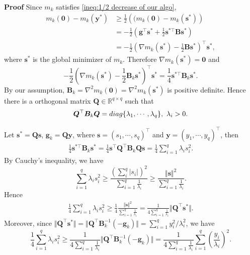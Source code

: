 \documentclass[10pt,a4paper]{amsart}
\renewenvironment{proof}[1]{\par\medskip\noindent\textbf{#1}\enspace\ignorespaces}{\par\medskip}
\begin{document}
\begin{proof}{Proof}
    Since $m_k$ satisfies \eqref{ineq:1/2 decrease of our algo}, \begin{equation*}
    \begin{aligned}
        m_k(\bm 0)-m_k(\bm y^*)
        &\geq\frac{1}{2}\left((m_k(\bm 0)-m_k(\bm s^*)\right)\\
        &=-\frac{1}{2}\left(\bm g^\top \bm s^*+\frac{1}{2}\bm s^{*\top}\bm B\bm s^*\right)\\
        &=-\frac{1}{2}\left(\nabla m_k(\bm s^*)-\frac{1}{2}\bm B\bm s^*\right)^\top\bm s^*,
    \end{aligned}
    \end{equation*}
where $\bm s^*$ is the global minimizer of $m_k$. Therefore $\nabla m_k(\bm s^*)=\bm 0$ and 
\begin{equation*}
        -\frac{1}{2}\left(\nabla m_k(\bm s^*)-\frac{1}{2}\bm B_k\bm s^*\right)^\top\bm s^*=\frac{1}{4}\bm s^{*\top}\bm B_k\bm s^*.
\end{equation*}
By our assumption, $\bm B_k=\nabla^2m_k(\bm 0)=\nabla^2m_k(\bm s^*)$ is positive definite. Hence there is a orthogonal matrix $\bm Q\in\mathbb{R}^{q\times q}$ such that
\begin{equation*}
    \bm Q^\top \bm B_k\bm Q={\rm diag}\{\lambda_1,\cdots,\lambda_q\},\ \lambda_i>0.
\end{equation*}

Let $\bm s^*=\bm Q \bm s$, $\bm g_k=\bm Q\bm y$, where $\bm s=(s_1,\cdots,s_q)^\top$ and $\bm y=(y_1,\cdots,y_q)^\top$, then 
\begin{equation*}
\begin{aligned}
     \frac{1}{4}\bm s^{*\top}\bm B_k\bm s^*=\frac{1}{4}\bm s^\top\bm Q^\top\bm B_k\bm Q\bm s=\frac{1}{4}\sum_{i=1}^{q}\lambda_i s_i^2.
\end{aligned}
\end{equation*}
By Cauchy's inequality, we have 
\begin{equation*}
    \sum_{i=1}^{q}\lambda_i s_i^2\geq \frac{\left(\sum_i^q| s_i|\right)^2}{\sum_{i=1}^q\frac{1}{\lambda_i}}\geq\frac{\Vert\bm s\Vert^2}{\sum_{i=1}^q\frac{1}{\lambda_i}}.
\end{equation*}
Hence 
\begin{equation*}
\begin{aligned}
     \frac{1}{4}\sum_{i=1}^{q}\lambda_i s_i^2\geq\frac{1}{4}\frac{\Vert\bm s\Vert^2}{\sum_{i=1}^q\frac{1}{\lambda_i}}=\frac{1}{4\sum_{i=1}^q\frac{1}{\lambda_i}}\Vert\bm Q^\top \bm s^*\Vert.
\end{aligned}
\end{equation*} 
Moreover, since $\Vert \bm Q^\top\bm s^*\Vert=\Vert \bm Q^\top\bm B_k^{-1}(-\bm g_k)\Vert=\sum_{i=1}^q y_i^2/\lambda_i^2$, we have
\begin{equation*}
    \frac{1}{4}\sum_{i=1}^{q}\lambda_i s_i^2\geq\frac{1}{4\sum_{i=1}^q\frac{1}{\lambda_i}}\Vert\bm Q^\top \bm B_k^{-1}\left(-\bm g_k\right)\Vert=\frac{1}{4\sum_{i=1}^q\frac{1}{\lambda_i}}\sum_{i=1}^q \left(\frac{y_i}{\lambda_i}\right)^2.
\end{equation*}


\end{proof}
\end{document}
